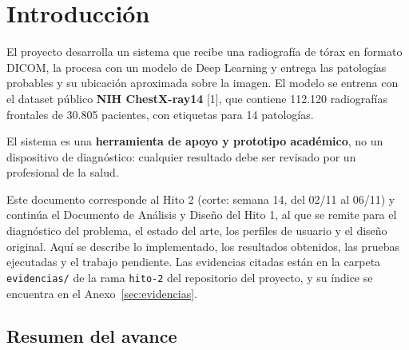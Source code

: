 \documentclass[11.5pt]{article}
\begin{document}
\begin{center}
\tableofcontents
\end{center}

\begin{center}
\listoffigures
\end{center}

\begin{center}
\listoftables
\end{center}

\clearpage
\newpage

\section{Introducción}

El proyecto desarrolla un sistema que recibe una radiografía de tórax en formato DICOM, la procesa con un modelo de Deep Learning y entrega las patologías probables y su ubicación aproximada sobre la imagen. El modelo se entrena con el dataset público \textbf{NIH ChestX-ray14} [1], que contiene 112.120 radiografías frontales de 30.805 pacientes, con etiquetas para 14 patologías.

El sistema es una \textbf{herramienta de apoyo y prototipo académico}, no un dispositivo de diagnóstico: cualquier resultado debe ser revisado por un profesional de la salud.

Este documento corresponde al Hito 2 (corte: semana 14, del 02/11 al 06/11) y continúa el Documento de Análisis y Diseño del Hito 1, al que se remite para el diagnóstico del problema, el estado del arte, los perfiles de usuario y el diseño original. Aquí se describe lo implementado, los resultados obtenidos, las pruebas ejecutadas y el trabajo pendiente. Las evidencias citadas están en la carpeta \texttt{evidencias/} de la rama \texttt{hito-2} del repositorio del proyecto, y su índice se encuentra en el Anexo~\ref{sec:evidencias}.

\subsection{Resumen del avance}
\end{document}
